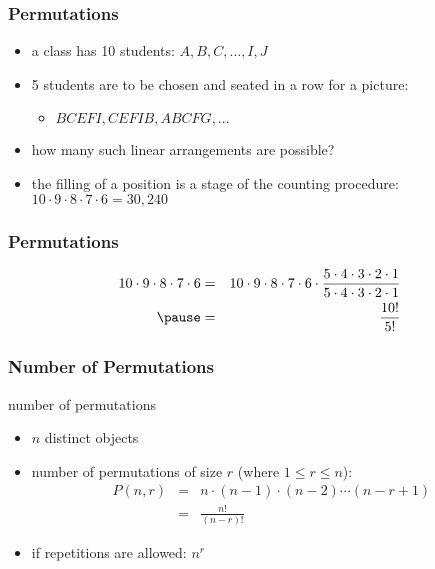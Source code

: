 \documentclass[dvipsnames]{beamer}
\begin{document}
\begin{frame}
  \frametitle{Permutations}

  \begin{example}
    \begin{itemize}
      \item a class has 10 students: $A, B, C, \ldots, I, J$
      \item 5 students are to be chosen and seated in a row for a picture:
      \begin{itemize}
        \item $BCEFI, CEFIB, ABCFG, \ldots$
      \end{itemize}
      \item how many such linear arrangements are possible?

      \pause
      \medskip
      \item the filling of a position is a stage of the counting procedure:\\
        $10 \cdot 9 \cdot 8 \cdot 7 \cdot 6 = 30,240$
    \end{itemize}
  \end{example}
\end{frame}

\begin{frame}
  \frametitle{Permutations}

  \begin{example}
    \begin{eqnarray*}
    10 \cdot 9 \cdot 8 \cdot 7 \cdot 6 & = &
      10 \cdot 9 \cdot 8 \cdot 7 \cdot 6 \cdot
      \frac{5 \cdot 4 \cdot 3 \cdot 2 \cdot 1}
      {5 \cdot 4 \cdot 3 \cdot 2 \cdot 1}\\\pause
    & = & \frac{10!}{5!}
    \end{eqnarray*}
  \end{example}
\end{frame}

\begin{frame}
  \frametitle{Number of Permutations}

  \begin{block}{number of permutations}
    \begin{itemize}
      \item $n$ distinct objects
      \item number of permutations of size $r$ (where $1 \leq r \leq n$):\\
      \begin{eqnarray*}
        P(n,r) & = & n \cdot (n-1) \cdot (n-2) \cdots (n-r+1)\\
               & = & \frac{n!}{(n-r)!}
      \end{eqnarray*}

      \pause
      \medskip
      \item if repetitions are allowed: $n^r$
    \end{itemize}
  \end{block}
\end{frame}
\end{document}
